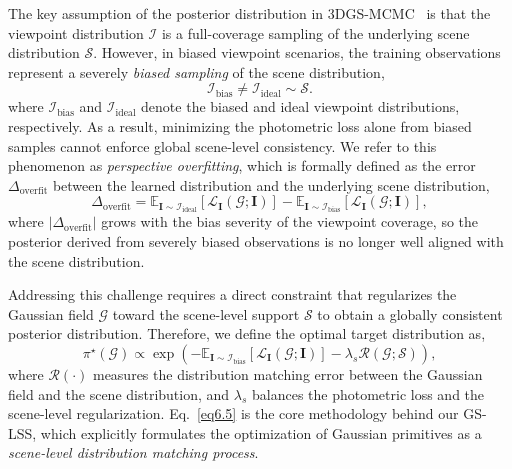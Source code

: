 \documentclass[lettersize,journal]{IEEEtran}
\begin{document}
The key assumption of the posterior distribution in 3DGS-MCMC~\cite{mcmc} is that the viewpoint distribution $\mathcal{I}$ is a full-coverage sampling of the underlying scene distribution $\mathcal{S}$. However, in biased viewpoint scenarios, the training observations represent a severely \emph{biased sampling} of the scene distribution,
\begin{equation}
    \mathcal{I}_{\text{bias}} \neq \mathcal{I}_{\text{ideal}} \sim \mathcal{S}.
    \label{eq5}
\end{equation}
where $\mathcal{I}_{\text{bias}}$ and $\mathcal{I}_{\text{ideal}}$ denote the biased and ideal viewpoint distributions, respectively.
As a result, minimizing the photometric loss alone from biased samples cannot enforce global scene-level consistency. We refer to this phenomenon as \emph{perspective overfitting}, which is formally defined as the error $\Delta_{\text{overfit}}$ between the learned distribution and the underlying scene distribution,
\begin{equation}
    \Delta_{\text{overfit}} = \mathbb{E}_{\mathbf{I} \sim \mathcal{I}_{\text{ideal}}} \left[ \mathcal{L}_{\mathbf{I}} (\mathcal{G}; \mathbf{I}) \right] - \mathbb{E}_{\mathbf{I} \sim \mathcal{I}_{\text{bias}}} \left[ \mathcal{L}_{\mathbf{I}} (\mathcal{G}; \mathbf{I}) \right],
    \label{eq5.1}
\end{equation}
where $\vert \Delta_{\text{overfit}} \vert$ grows with the bias severity of the viewpoint coverage, so the posterior derived from severely biased observations is no longer well aligned with the scene distribution.

Addressing this challenge requires a direct constraint that regularizes the Gaussian field $\mathcal{G}$ toward the scene-level support $\mathcal{S}$ to obtain a globally consistent posterior distribution. Therefore, we define the optimal target distribution as,
\begin{equation}
    \pi^{\star} (\mathcal{G}) \propto \exp \left( - \mathbb{E}_{\mathbf{I}\sim\mathcal{I}_{\text{bias}}}\!\left[\mathcal{L}_{\mathbf{I}}(\mathcal{G};\mathbf{I})\right] - \lambda_{s} \mathcal{R}(\mathcal{G};\mathcal{S}) \right),
    \label{eq6.5}
\end{equation}
where $\mathcal{R}(\cdot)$ measures the distribution matching error between the Gaussian field and the scene distribution, and $\lambda_{s}$ balances the photometric loss and the scene-level regularization. Eq.~\ref{eq6.5} is the core methodology behind our GS-LSS, which explicitly formulates the optimization of Gaussian primitives as a \emph{scene-level distribution matching process}.
\end{document}
